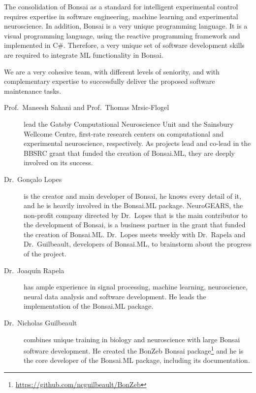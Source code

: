 The consolidation of Bonsai as a standard for intelligent experimental control
requires expertise in software engineering, machine learning and experimental
neuroscience.
%
In addition, Bonsai is a very unique programming language. It is a visual
programming language, using the reactive programming framework and implemented
in C\#.
%
Therefore, a very unique set of software development skills are required to
integrate ML functionality in Bonsai.

We are a very cohesive team, with different levels of seniority, and with
complementary expertise to successfully deliver the proposed software
maintenance tasks.

\begin{description}

    \item[Prof.~Maneesh Sahani and Prof.~Thomas Mrsic-Flogel] lead the Gatsby
        Computational Neuroscience Unit and the Sainsbury Wellcome Centre,
        first-rate research centers on computational and experimental
        neuroscience, respectively. As projects lead and co-lead in the BBSRC
        grant that funded the creation of Bonsai.ML, they are deeply involved
        on its success.

    \item[Dr.~Gonçalo Lopes] is the creator and main developer of Bonsai, he
        knows every detail of it, and he is heavily involved in the Bonsai.ML
        package.
        NeuroGEARS, the non-profit company directed by Dr.~Lopes that is the
        main contributor to the development of Bonsai, is a business partner in
        the grant that funded the creation of Bonsai.ML.
        Dr.~Lopes meets weekly with Dr.~Rapela and Dr.~Guilbeault, developers
        of Bonsai.ML, to brainstorm about the progress of the project.

    \item[Dr.~Joaquín Rapela] has ample experience in signal processing,
        machine learning, neuroscience, neural data analysis and software
        development. He leads the implementation of the Bonsai.ML package.

    \item[Dr.~Nicholas Guilbeault] combines unique training in biology and
        neuroscience with large Bonsai software development. He created the
        BonZeb Bonsai
        package\footnote[15]{\url{https://github.com/ncguilbeault/BonZeb}} and he
        is the core developer of the Bonsai.ML package, including its
        documentation.

\end{description}

